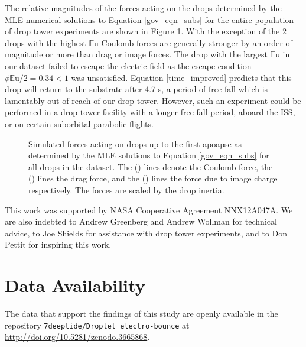 \documentclass[aip,reprint, floatfix]{revtex4-1}
\begin{document}
The relative magnitudes of the forces acting on the drops determined by the MLE numerical solutions to Equation \ref{gov_eqn_subs} for the entire population of drop tower experiments are shown in Figure \ref{fig:forces}. With the exception of the 2 drops with the highest $\mathbb{E}\mbox{u}$ Coulomb forces are generally stronger by an order of magnitude or more than drag or image forces. The drop with the largest $\mathbb{E}\mbox{u}$ in our dataset failed to escape the electric field as the escape condition $\phi \mathbb{E}\mbox{u} / 2 = 0.34 < 1$ was unsatisfied. Equation \ref{time_improved} predicts that this drop will return to the substrate after 4.7 s, a period of free-fall which is lamentably out of reach of our drop tower. However, such an experiment could be performed in a drop tower facility with a longer free fall period, aboard the ISS, or on certain suborbital parabolic flights.
\begin{figure}[!htb]
    \centering
    \resizebox{0.5\textwidth}{!}{}
    \caption{Simulated forces acting on drops up to the first apoapse as determined by the MLE solutions to Equation \ref{gov_eqn_subs} for all drops in the dataset. The (\protect\redline) lines denote the Coulomb force, the (\protect\blueline) lines the drag force, and the (\protect\cyanline) lines the force due to image charge respectively. The forces are scaled by the drop inertia.\label{fig:forces}}
\end{figure}

\begin{acknowledgments}
This work was supported by NASA Cooperative Agreement NNX12A047A. We are also indebted to Andrew Greenberg and Andrew Wollman for technical advice, to Joe Shields for assistance with drop tower experiments, and to Don Pettit for inspiring this work.
\end{acknowledgments}

\section*{Data Availability}
The data that support the findings of this study are openly available in the repository \verb|7deeptide/Droplet_electro-bounce| at \href{http://doi.org/10.5281/zenodo.3665868}{http://doi.org/10.5281/zenodo.3665868}. \citep{schmidt_droplet_electro-bounce_2017}

\end{document}

